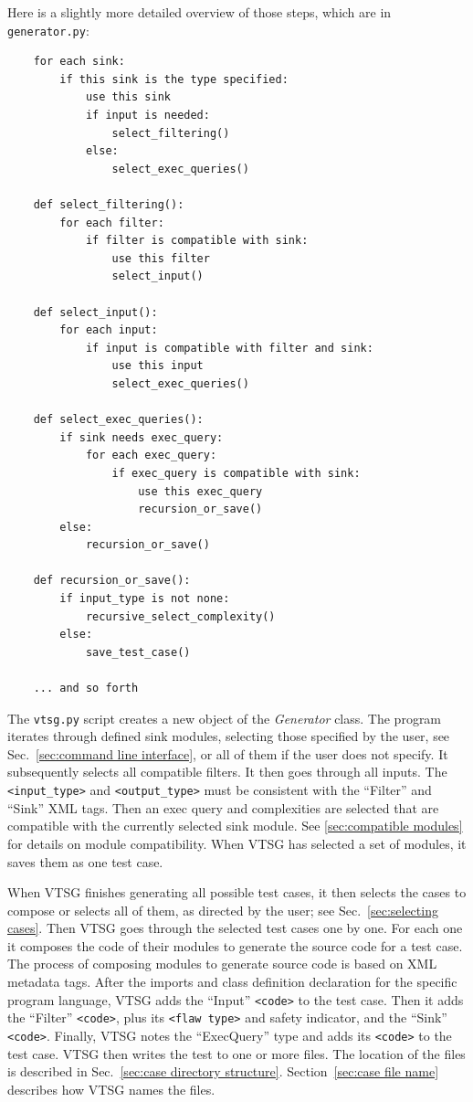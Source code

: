 \clearpage
Here is a slightly more detailed
overview of those steps, which are in \verb|generator.py|:
\begin{verbatim}
    for each sink:
        if this sink is the type specified:
            use this sink
            if input is needed:
                select_filtering()
            else:
                select_exec_queries()

    def select_filtering():
        for each filter:
            if filter is compatible with sink:
                use this filter
                select_input()

    def select_input():
        for each input:
            if input is compatible with filter and sink:
                use this input
                select_exec_queries()

    def select_exec_queries():
        if sink needs exec_query:
            for each exec_query:
                if exec_query is compatible with sink:
                    use this exec_query
                    recursion_or_save()
        else:
            recursion_or_save()

    def recursion_or_save():
        if input_type is not none:
            recursive_select_complexity()
        else:
            save_test_case()

    ... and so forth
\end{verbatim}

The \verb|vtsg.py| script creates a new object of the \emph{Generator} class.
The program iterates through defined sink modules, selecting those specified by
the user, see Sec.~\ref{sec:command line interface}, or all of them if the user
does not specify.  It subsequently selects all compatible filters.  It then goes
through all inputs.  The \verb|<input_type>| and \verb|<output_type>| must be
consistent with the ``Filter'' and ``Sink'' XML tags.  Then an exec query and
complexities are selected that are compatible with the currently selected sink
module.  See \ref{sec:compatible modules} for details on module compatibility.
When VTSG has selected a set of modules, it saves them as one test case.

When VTSG finishes generating all possible test cases, it then selects the cases
to compose or selects all of them, as directed by the user; see
Sec.~\ref{sec:selecting cases}.  Then VTSG goes through the selected test cases
one by one.  For each one it composes the code of their modules to generate the
source code for a test case.  The process of composing modules to generate
source code is based on XML metadata tags.  After the imports and class
definition declaration for the specific program language, VTSG adds the ``Input''
\verb|<code>| to the test case.  Then it adds the ``Filter'' \verb|<code>|, plus its
\verb|<flaw type>| and safety indicator, and the ``Sink'' \verb|<code>|.
Finally, VTSG notes the ``ExecQuery'' type and adds its \verb|<code>| to the test
case.  VTSG then writes the test to one or more files.  The location of the files is
described in Sec.~\ref{sec:case directory structure}.
Section~\ref{sec:case file name} describes how VTSG names the files.

